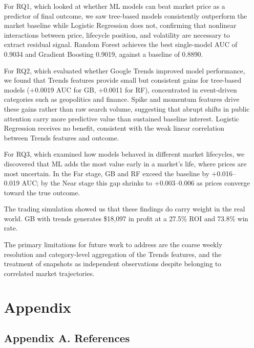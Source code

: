 \documentclass[11pt,twocolumn]{article}
\begin{document}
For RQ1, which looked at whether ML models can beat market price as a predictor of final outcome, we saw tree-based models consistently outperform the market
baseline while Logistic Regression does not, confirming that
nonlinear interactions between price, lifecycle position, and
volatility are necessary to extract residual signal. Random Forest
achieves the best single-model AUC of 0.9034 and Gradient Boosting
0.9019, against a baseline of 0.8890.

For RQ2, which evaluated whether Google Trends improved model performance, we found that Trends features provide small but consistent gains for
tree-based models ($+$0.0019 AUC for GB, $+$0.0011 for RF),
concentrated in event-driven categories such as geopolitics and
finance. Spike and momentum features drive these gains rather than
raw search volume, suggesting that abrupt shifts in public attention
carry more predictive value than sustained baseline interest.
Logistic Regression receives no benefit, consistent with the weak
linear correlation between Trends features and outcome.

For RQ3, which examined how models behaved in different market lifecycles, we discovered that ML adds the most value early in a market's life, where
prices are most uncertain. In the Far stage, GB and RF exceed the
baseline by $+$0.016--0.019 AUC; by the Near stage this gap shrinks
to $+$0.003--0.006 as prices converge toward the true outcome.

The trading simulation showed us that these findings do carry weight in the real world. GB with trends generates \$18,097 in profit at a 27.5\% ROI and 73.8\% win rate.

The primary limitations for future work to address are the coarse weekly resolution and category-level aggregation of the Trends features, and the treatment of snapshots as independent observations despite belonging to correlated market trajectories.


\clearpage
\newpage
\onecolumn
\section*{Appendix}

\subsection*{Appendix A. References}
\end{document}
